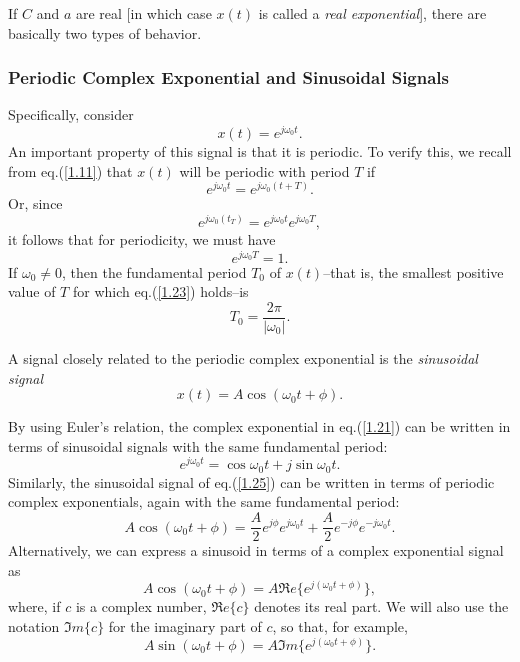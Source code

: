 \documentclass[a4paper,10pt,twoside]{book}
\begin{document}
If $C$ and $a$ are real [in which case $x(t)$ is called a \textit{real exponential}], there are basically two types of behavior.

\subsubsection{Periodic Complex Exponential and Sinusoidal Signals}

Specifically, consider
\begin{equation}
    x(t)=e^{j\omega_0 t}.
    \label{1.21}
\end{equation}
An important property of this signal is that it is periodic. To verify this, we recall from eq.\;(\ref{1.11}) that $x(t)$ will be periodic with period $T$ if
\begin{equation}
    e^{j\omega_0 t}=e^{j\omega_0(t+T)}.
    \label{1.22}
\end{equation}
Or, since $$e^{j\omega_0(t_T)}=e^{j\omega_0 t}e^{j\omega_0 T},$$ it follows that for periodicity, we must have
\begin{equation}
    e^{j\omega_0 T}=1.
    \label{1.23}
\end{equation}
If $\omega_0\ne 0$, then the fundamental period $T_0$ of $x(t)$--that is, the smallest positive value of $T$ for which eq.\;(\ref{1.23}) holds--is
\begin{equation}
    T_0=\dfrac{2\pi}{|\omega_0|}.
    \label{1.24}
\end{equation}

A signal closely related to the periodic complex exponential is the \textit{sinusoidal signal}
\begin{equation}
    x(t)=A\cos(\omega_0t+\phi).
    \label{1.25}
\end{equation}

By using Euler's relation, the complex exponential in eq.\;(\ref{1.21}) can be written in terms of sinusoidal signals with the same fundamental period:
\begin{equation}
    e^{j\omega_0 t}=\cos\omega_0t+j\sin\omega_0t.
    \label{1.26}
\end{equation}
Similarly, the sinusoidal signal of eq.\;(\ref{1.25}) can be written in terms of periodic complex exponentials, again with the same fundamental period:
\begin{equation}
    A\cos(\omega_{0}t+\phi)=\frac{A}{2}e^{j\phi}e^{j\omega_{0}t}+\frac{A}{2}e^{-j\phi}e^{-j\omega_{0}t}.
    \label{1.27}
\end{equation}
Alternatively, we can express a sinusoid in terms of a complex exponential signal as
\begin{equation}
    A\cos(\omega_0t+\phi)=A\Re e\{e^{j(\omega_0t+\phi)}\},
    \label{1.28}
\end{equation}
where, if $c$ is a complex number, $\Re e\{c\}$ denotes its real part. We will also use the notation $\Im m\{c\}$ for the imaginary part of $c$, so that, for example,
\begin{equation}
    A\sin(\omega_0t+\phi)=A\Im m\{e^{j(\omega_0t+\phi)}\}.
    \label{1.29}
\end{equation}
\end{document}
